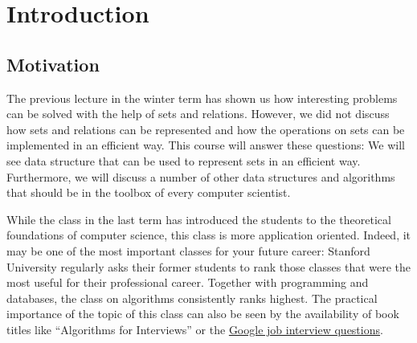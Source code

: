 \chapter{Introduction}
\section{Motivation}
The previous lecture in the winter term has shown us how interesting problems can be solved with the
help of sets and relations.  However, we did not discuss how sets and relations can be represented
and how the operations on sets can be implemented in an efficient way.  This course will answer
these questions:  We will see data structure that can be used to represent sets in an efficient way.
Furthermore, we will discuss a number of other data structures and algorithms that should be in the
toolbox of every computer scientist.

While the class in the last term has introduced the students to the theoretical foundations of
computer science, this class is more application oriented.  Indeed, it may be one of the most 
important classes for your future career: Stanford University regularly asks their former students 
to rank those classes that were the most useful for their professional career.  Together with
programming and databases, the class on algorithms consistently ranks highest.  The practical
importance of the topic of this class can also be seen by the availability of book titles like 
 ``Algorithms for Interviews'' \cite{aziz:10} or the
\href{http://www.youtube.com/watch?v=k4RRi_ntQc8}{Google job interview questions}.
 
 
